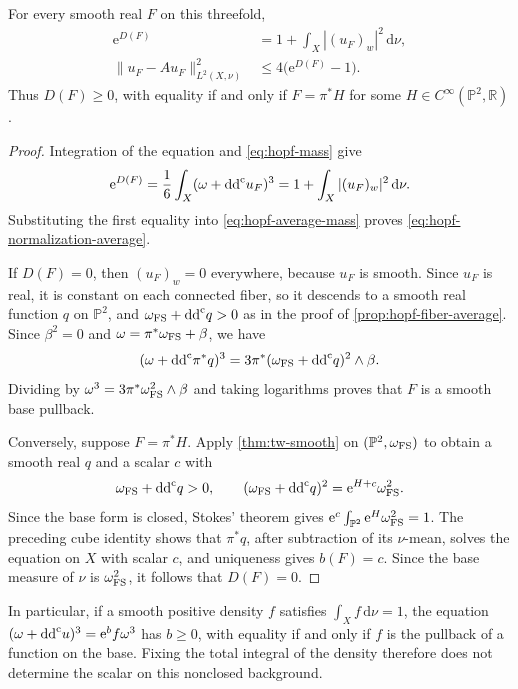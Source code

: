 \begin{proposition}\label{prop:hopf-normalization-defect}
For every smooth real $F$ on this threefold,
\begin{align}
 \mathrm{e}^{D(F)}&=1+\int_X|(u_F)_w|^2\,\mathrm{d}\nu,
 \label{eq:hopf-normalization-energy}\\
 \|u_F-Au_F\|_{L^2(X,\nu)}^2
 &\leq4\bigl(\mathrm{e}^{D(F)}-1\bigr).
 \label{eq:hopf-normalization-average}
\end{align}
Thus $D(F)\geq0$, with equality if and only if $F=\pi^*H$ for some $H\in C^\infty(\mathbb P^2,\mathbb R)$.
\end{proposition}
\begin{proof}
Integration of the equation and \eqref{eq:hopf-mass} give
\[
 \mathrm{e}^{D(F)}=\frac16\int_X(\omega+\mathrm{dd}^{\mathrm{c}} u_F)^3
                  =1+\int_X|(u_F)_w|^2\,\mathrm{d}\nu.
\]
Substituting the first equality into \eqref{eq:hopf-average-mass} proves \eqref{eq:hopf-normalization-average}.

If $D(F)=0$, then $(u_F)_w=0$ everywhere, because $u_F$ is smooth. Since $u_F$ is real, it is constant on each connected fiber, so it descends to a smooth real function $q$ on $\mathbb P^2$, and $\omega_{\mathrm{FS}}+\mathrm{dd}^{\mathrm{c}} q>0$ as in the proof of \cref{prop:hopf-fiber-average}. Since $\beta^2=0$ and $\omega=\pi^*\omega_{\mathrm{FS}}+\beta$, we have
\[
 (\omega+\mathrm{dd}^{\mathrm{c}}\pi^*q)^3
       =3\pi^*(\omega_{\mathrm{FS}}+\mathrm{dd}^{\mathrm{c}} q)^2\wedge\beta.
\]
Dividing by $\omega^3=3\pi^*\omega_{\mathrm{FS}}^2\wedge\beta$ and taking logarithms proves that $F$ is a smooth base pullback.

Conversely, suppose $F=\pi^*H$. Apply \cref{thm:tw-smooth} on $(\mathbb P^2,\omega_{\mathrm{FS}})$ to obtain a smooth real $q$ and a scalar $c$ with
\[
 \omega_{\mathrm{FS}}+\mathrm{dd}^{\mathrm{c}} q>0,\qquad
 (\omega_{\mathrm{FS}}+\mathrm{dd}^{\mathrm{c}} q)^2=\mathrm{e}^{H+c}\omega_{\mathrm{FS}}^2.
\]
Since the base form is closed, Stokes' theorem gives $\mathrm{e}^c\int_{\mathbb P^2}\mathrm{e}^H\omega_{\mathrm{FS}}^2=1$. The preceding cube identity shows that $\pi^*q$, after subtraction of its $\nu$-mean, solves the equation on $X$ with scalar $c$, and uniqueness gives $b(F)=c$. Since the base measure of $\nu$ is $\omega_{\mathrm{FS}}^2$, it follows that $D(F)=0$.
\end{proof}

In particular, if a smooth positive density $f$ satisfies $\int_Xf\,\mathrm{d}\nu=1$, the equation $(\omega+\mathrm{dd}^{\mathrm{c}} u)^3=\mathrm{e}^b f\omega^3$ has $b\geq0$, with equality if and only if $f$ is the pullback of a function on the base. Fixing the total integral of the density therefore does not determine the scalar on this nonclosed background.

